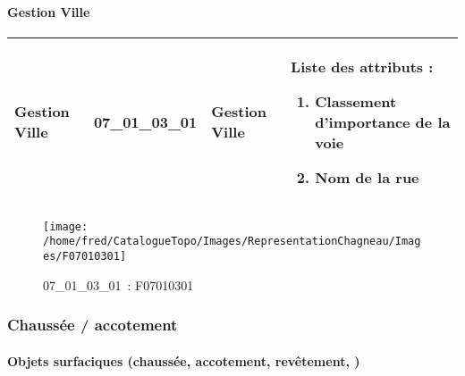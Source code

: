 \documentclass[12pt,titlepage,oneside]{book}
\begin{document}
\paragraph{Gestion Ville}
\noindent
\vspace{\baselineskip}

\renewcommand{\arraystretch}{1.2}
\begin{supertabular}{|p{10cm}|c|p{13cm}|p{12cm}|}
 Gestion Ville & 07\_01\_03\_01 & Gestion Ville & Liste des attributs :
\begin{enumerate}
  \item Classement d'importance de la voie  \item Nom de la rue\end{enumerate}
\\
\hline
\end{supertabular}
\begin{figure}[h!]
  \hfill         %
  \begin{minipage}[t]{3cm}
    \begin{center}
      \texttt{[image: /home/fred/CatalogueTopo/Images/RepresentationChagneau/Images/F07010301]}
      \caption[~07\_01\_03\_01]{\small{07\_01\_03\_01~:} \tiny{F07010301}}\label{F07010301}
    \end{center}
  \end{minipage}
\end{figure}

\subsubsection{\large Chaussée / accotement}
\paragraph{Objets surfaciques (chaussée, accotement, revêtement, )}
\noindent
\vspace{\baselineskip}
\end{document}
